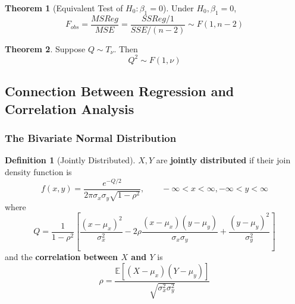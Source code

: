 \documentclass[11pt]{article}
\theoremstyle{definition}
\newtheorem{theorem}{Theorem}[section]
\newtheorem{definition}{Definition}[section]
\numberwithin{equation}{section}
\begin{document}
\begin{theorem}[Equivalent Test of $H_0:\beta_1=0$]

Under $H_0, \beta_1=0$,
\begin{equation}
  F_{obs} = \frac{MSReg}{MSE} = \frac{SSReg/1}{SSE/(n-2)}\sim F(1,n-2)
\end{equation}

\end{theorem}

\begin{theorem}
  Suppose $Q\sim T_\nu$. Then
  \begin{equation}
    Q^2\sim F(1,\nu)
  \end{equation}
\end{theorem}

\subsection{Connection Between Regression and Correlation Analysis}
\subsubsection{The Bivariate Normal Distribution}

\begin{definition}[Jointly Distributed]
  $X,Y$ are \textbf{jointly distributed} if their join density function is
  \begin{equation}
    f(x,y) = \frac{e^{-Q/2}}{2\pi\sigma_x\sigma_y\sqrt{1-\rho^2}},\qquad -\infty < x < \infty, -\infty < y < \infty
  \end{equation}
  where
  \begin{equation}
    Q = \frac{1}{1 - \rho^2}\left[ \frac{(x - \mu_x)^2}{\sigma_x^2} - 2\rho\frac{(x-\mu_x)(y-\mu_y)}{\sigma_x\sigma_y} + \frac{(y-\mu_y)^2}{\sigma_y^2}\right]
  \end{equation}
  and the \textbf{correlation between $X$ and $Y$} is
  \begin{equation}
    \rho = \frac{\mathbb{E}[(X - \mu_x)(Y - \mu_y)]}{\sqrt{\sigma_x^2\sigma_y^2}}
  \end{equation}
\end{definition}
\end{document}
